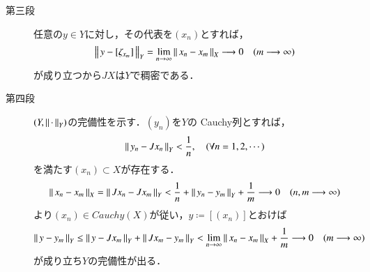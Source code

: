 \begin{prf}
\begin{description}
			\item[第三段]
				任意の$y \in Y$に対し，その代表を$(x_n)$とすれば，
				\begin{align}
					\left\|\, y - [\zeta_{x_m}]\, \right\|_{Y}
					= \lim_{n \to \infty} \left\|\, x_n - x_m\, \right\|_{X}
					\longrightarrow 0
					\quad (m \longrightarrow \infty)
				\end{align}
				が成り立つから$J X$は$Y$で稠密である．
				
			\item[第四段]
				$(Y,\left\|\, \cdot\, \right\|_{Y})$の完備性を示す．$(y_n)$を$Y$の
				Cauchy列とすれば，
				\begin{align}
					\left\|\, y_n - J x_n\, \right\|_{Y} < \frac{1}{n},
					\quad (\forall n = 1,2,\cdots)
				\end{align}
				を満たす$(x_n) \subset X$が存在する．
				\begin{align}
					\left\|\, x_n - x_m\, \right\|_{X}
					= \left\|\, J x_n - J x_m\, \right\|_{Y}
					< \frac{1}{n} + \left\|\, y_n - y_m\, \right\|_{Y} + \frac{1}{m}
					\longrightarrow 0
					\quad (n,m \longrightarrow \infty)
				\end{align} 
				より$(x_n) \in Cauchy(X)$が従い，$y \coloneqq [(x_n)]$とおけば
				\begin{align}
					\left\|\, y - y_m\, \right\|_{Y}
					\leq \left\|\, y - J x_m\, \right\|_{Y} + \left\|\, J x_m - y_m\, \right\|_{Y}
					< \lim_{n \to \infty} \left\|\, x_n - x_m\, \right\|_{X} + \frac{1}{m}
					\longrightarrow 0
					\quad (m \longrightarrow \infty)
				\end{align}
				が成り立ち$Y$の完備性が出る．
		\end{description}
	\end{prf}